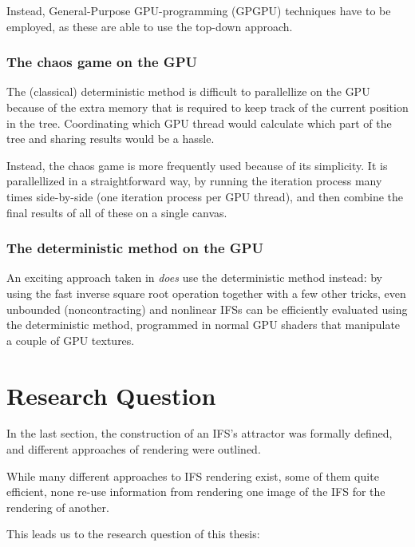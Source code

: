 \documentclass[11pt]{article}
\begin{document}
Instead, General-Purpose GPU-programming (GPGPU) techniques have to be employed, as these are able to use the top-down approach.

\subsubsection{The chaos game on the GPU}
\label{sec:org9e84a46}
\label{subsection:chaos_game_gpu}

The (classical) deterministic method is difficult to parallellize on the GPU because of the extra memory that is required to keep track of the current position in the tree.
Coordinating which GPU thread would calculate which part of the tree and sharing results would be a hassle.

Instead, the chaos game is more frequently used because of its simplicity. 
It is parallellized in a straightforward way, 
by running the iteration process many times side-by-side (one iteration process per GPU thread),
and then combine the final results of all of these on a single canvas. \cite{green2005gpu}

\subsubsection{The deterministic method on the GPU}
\label{sec:org838bcba}
\label{subsection:deterministic_gpu}

An exciting approach taken in \cite{lawlor2012gpu} \emph{does} use the deterministic method instead:
by using the fast inverse square root operation together with a few other tricks, 
even unbounded (noncontracting) and nonlinear IFSs can be efficiently
evaluated using the deterministic method, programmed in normal GPU shaders that manipulate a couple of GPU textures.

\section{Research Question}
\label{sec:org2e4dac1}
\label{section:research_question}

In the last section, the construction of an IFS's attractor was formally defined, 
and different approaches of rendering were outlined.

While many different approaches to IFS rendering exist, some of them quite efficient,
none re-use information from rendering one image of the IFS for the rendering of another.

This leads us to the research question of this thesis:
\end{document}
